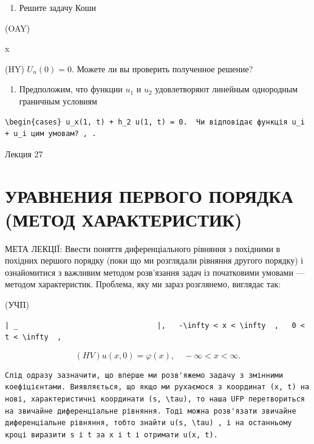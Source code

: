 \documentclass[
  ukrainian,
]{article}
\providecommand{\tightlist}{%
  \setlength{\itemsep}{0pt}\setlength{\parskip}{0pt}}
\begin{document}
\begin{enumerate}
\def\labelenumi{\arabic{enumi}.}
\setcounter{enumi}{4}
\tightlist
\item
  Решите задачу Коши
\end{enumerate}

(OAY)

x

(HY) \(U_n(0) = 0.\) Можете ли вы проверить полученное решение?

\begin{enumerate}
\def\labelenumi{\arabic{enumi}.}
\setcounter{enumi}{5}
\tightlist
\item
  Предположим, что функции \(u_1\) и \(u_2\) удовлетворяют линейным
  однородным граничным условиям
\end{enumerate}

\begin{verbatim}
\begin{cases} u_x(1, t) + h_2 u(1, t) = 0.  Чи відповідає функція u_i + u_i цим умовам? , .
\end{verbatim}

Лекция 27

\section{УРАВНЕНИЯ ПЕРВОГО ПОРЯДКА (МЕТОД
ХАРАКТЕРИСТИК)}\label{ux443ux440ux430ux432ux43dux435ux43dux438ux44f-ux43fux435ux440ux432ux43eux433ux43e-ux43fux43eux440ux44fux434ux43aux430-ux43cux435ux442ux43eux434-ux445ux430ux440ux430ux43aux442ux435ux440ux438ux441ux442ux438ux43a}

МЕТА ЛЕКЦІЇ: Ввести поняття диференціального рівняння з похідними в
похідних першого порядку (поки що ми розглядали рівняння другого
порядку) і ознайомитися з важливим методом розв'язання задач із
початковими умовами --- методом характеристик. Проблема, яку ми зараз
розглянемо, виглядає так:

(УЧП)

\begin{verbatim}
| _                                |,   -\infty < x < \infty  ,   0 < t < \infty  ,
\end{verbatim}

\[
(HV)   u(x, 0) = \varphi(x), \quad -\infty < x < \infty.
\]

\begin{verbatim}
Слід одразу зазначити, що вперше ми розв'яжемо задачу з змінними коефіцієнтами. Виявляється, що якщо ми рухаємося з координат (x, t) на нові, характеристичні координати (s, \tau), то наша UFP перетвориться на звичайне диференціальне рівняння. Тоді можна розв'язати звичайне диференціальне рівняння, тобто знайти u(s, \tau) , і на останньому кроці виразити s і t за x і t і отримати u(x, t).
\end{verbatim}
\end{document}
